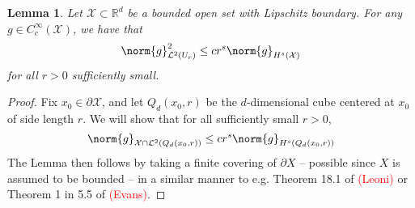 \documentclass{article}
\newcommand{\Reals}{\mathbb{R}}
\newcommand{\1}{\mathbf{1}}
\newcommand{\Rd}{\Reals^d}
\newcommand{\Xset}{\mathcal{X}}
\newcommand{\Leb}{\mathcal{L}}
\theoremstyle{alden}
\theoremstyle{aldenthm}
\newtheorem{lemma}{Lemma}
\theoremstyle{definition}
\theoremstyle{remark}
\begin{document}
\begin{lemma}
	\label{lem:boundary_term_sobolev}
	Let $\Xset \subset \Rd$ be a bounded open set with Lipschitz boundary. For any $g \in C_c^{\infty}(\Xset)$, we have that 
	\begin{equation*}
	\norm{g}_{\Leb^2(U_r)}^2 \leq c r^s \norm{g}_{H^s(\Xset)}
	\end{equation*}
	for all $r > 0$ sufficiently small.
\end{lemma}
\begin{proof}
	Fix $x_0 \in \partial \Xset$, and let $Q_d(x_0,r)$ be the $d$-dimensional cube centered at $x_0$ of side length $r$. We will show that for all sufficiently small $r > 0$,
	\begin{equation}
	\norm{g}_{\Xset \cap \Leb^2(Q_d(x_0,r))} \leq c r^s \norm{g}_{H^s(Q_d(x_0,r))}
	\end{equation}
	The Lemma then follows by taking a finite covering of $\partial X$ -- possible since $X$ is assumed to be bounded -- in a similar manner to e.g. Theorem 18.1 of \textcolor{red}{(Leoni)} or Theorem 1 in 5.5 of \textcolor{red}{(Evans)}.
	

\end{proof}
\end{document}
